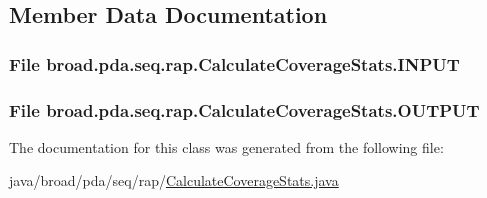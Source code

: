 \subsection{Member Data Documentation}
\hypertarget{classbroad_1_1pda_1_1seq_1_1rap_1_1_calculate_coverage_stats_af99791ff675fe2b297a8eec48211796e}{
\subsubsection[{I\+N\+P\+U\+T}]{\setlength{\rightskip}{0pt plus 5cm}File broad.\+pda.\+seq.\+rap.\+Calculate\+Coverage\+Stats.\+I\+N\+P\+U\+T}}\label{classbroad_1_1pda_1_1seq_1_1rap_1_1_calculate_coverage_stats_af99791ff675fe2b297a8eec48211796e}
\hypertarget{classbroad_1_1pda_1_1seq_1_1rap_1_1_calculate_coverage_stats_ac50a4cf5dec9ef41a42a9b3555959874}{
\subsubsection[{O\+U\+T\+P\+U\+T}]{\setlength{\rightskip}{0pt plus 5cm}File broad.\+pda.\+seq.\+rap.\+Calculate\+Coverage\+Stats.\+O\+U\+T\+P\+U\+T}}\label{classbroad_1_1pda_1_1seq_1_1rap_1_1_calculate_coverage_stats_ac50a4cf5dec9ef41a42a9b3555959874}


The documentation for this class was generated from the following file\+:\begin{DoxyCompactItemize}
\item 
java/broad/pda/seq/rap/\hyperlink{_calculate_coverage_stats_8java}{Calculate\+Coverage\+Stats.\+java}\end{DoxyCompactItemize}
